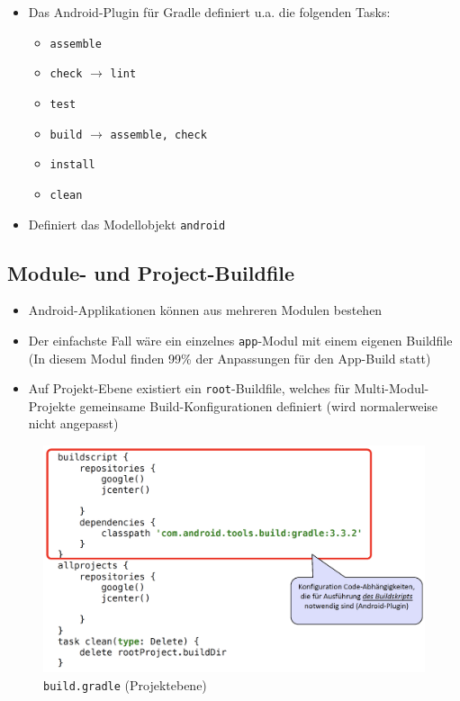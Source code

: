 \documentclass[a4paper]{article}
\begin{document}
{\begin{itemize}
			\item Das Android-Plugin für Gradle definiert u.a. die folgenden Tasks:
			\begin{itemize}
				\item \texttt{assemble}
				\item \texttt{check} $\rightarrow$ \texttt{lint}
				\item \texttt{test}
				\item \texttt{build} $\rightarrow$ \texttt{assemble, check}
				\item \texttt{install}
				\item \texttt{clean}
			\end{itemize}
			
			\item Definiert das Modellobjekt \texttt{android}
			
		\end{itemize}
	
	\subsection{Module- und Project-Buildfile}
	
	\begin{itemize}
		
		\item Android-Applikationen können aus mehreren Modulen bestehen
		
		\item Der einfachste Fall wäre ein einzelnes \texttt{app}-Modul mit einem eigenen Buildfile\\
		(In diesem Modul finden 99\% der Anpassungen für den App-Build statt)
		
		\item Auf Projekt-Ebene existiert ein \texttt{root}-Buildfile, welches für Multi-Modul-Projekte gemeinsame Build-Konfigurationen definiert (wird normalerweise nicht angepasst)
		
	\end{itemize}

	\newpage
	
	\begin{figure}[!htb]
		\centering
		\includegraphics[width=.9\textwidth]{img/flashtalk1/gradle_project.png}
		\caption{\texttt{build.gradle} (Projektebene)}
		\label{fig:gradle_project}
	\end{figure}

}
\end{document}
